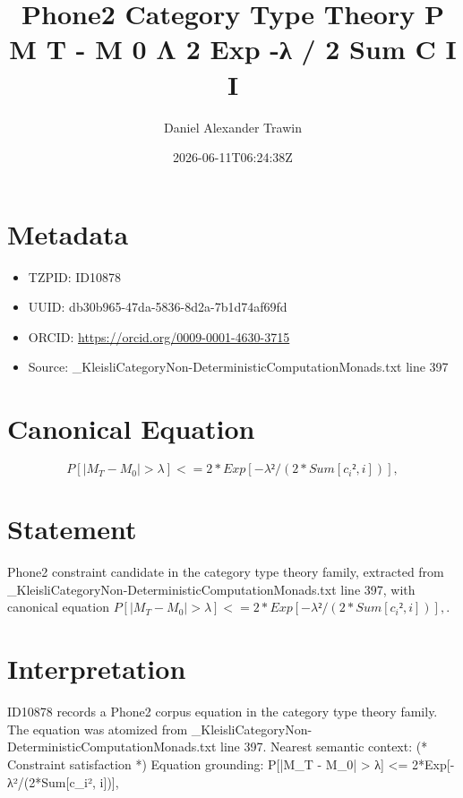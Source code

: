\documentclass[11pt]{article}
\title{Phone2 Category Type Theory P M T - M 0 Λ 2 Exp -λ / 2 Sum C I I}
\author{Daniel Alexander Trawin}
\date{2026-06-11T06:24:38Z}
\begin{document}
\maketitle
\section*{Metadata}
\begin{itemize}
\item TZPID: ID10878
\item UUID: db30b965-47da-5836-8d2a-7b1d74af69fd
\item ORCID: \url{https://orcid.org/0009-0001-4630-3715}
\item Source: _KleisliCategoryNon-DeterministicComputationMonads.txt line 397
\end{itemize}
\section*{Canonical Equation}
\[
P[|M_T - M_0| > λ] <= 2*Exp[-λ²/(2*Sum[c_i², {i}])],
\]
\section*{Statement}
Phone2 constraint candidate in the category type theory family, extracted from _KleisliCategoryNon-DeterministicComputationMonads.txt line 397, with canonical equation $P[|M_T - M_0| > λ] <= 2*Exp[-λ²/(2*Sum[c_i², {i}])],$.
\section*{Interpretation}
ID10878 records a Phone2 corpus equation in the category type theory family. The equation was atomized from _KleisliCategoryNon-DeterministicComputationMonads.txt line 397. Nearest semantic context: (* Constraint satisfaction *) Equation grounding: P[|M_T - M_0| > λ] <= 2*Exp[-λ²/(2*Sum[c_i², {i}])],
\end{document}
